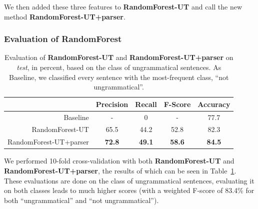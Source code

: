 \documentclass[a4paper,10pt]{scrartcl}
\theoremstyle{style}
\begin{document}
We then added these three features to \textbf{RandomForest-UT} and call the new method \textbf{RandomForest-UT+parser}.

\subsubsection{Evaluation of RandomForest}

\begin{table}
\begin{center}
\begin{tabular}{r|c|c|c|c|}
  & \textbf{Precision} & \textbf{Recall} & \textbf{F-Score} & \textbf{Accuracy}\\
  \hline
  Baseline & - & 0 & - & 77.7\\
  \hline
  RandomForest-UT & 65.5 & 44.2 & 52.8 & 82.3\\
  \hline
  RandomForest-UT+parser & \textbf{72.8} & \textbf{49.1} & \textbf{58.6} & \textbf{84.5}\\
  \hline
  \end{tabular}
\end{center}
\caption{Evaluation of \textbf{RandomForest-UT} and \textbf{RandomForest-UT+parser} on \textit{test}, in percent, based on the class of ungrammatical sentences. As Baseline, we classified every sentence with the most-frequent class, ``not ungrammatical''.}
\label{eval_randomforest}
\end{table}


We performed 10-fold cross-validation with both \textbf{RandomForest-UT} and \textbf{RandomForest-UT+parser}, the results of which can be seen in Table~\ref{eval_randomforest}. These evaluations are done on the class of ungrammatical sentences, evaluating it on both classes leads to much higher scores (with a weighted F-score of 83.4\% for both ``ungrammatical'' and ``not ungrammatical'').
\end{document}

